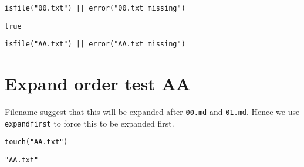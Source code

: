 \begin{lstlisting}[]
isfile("00.txt") || error("00.txt missing")
\end{lstlisting}


\begin{lstlisting}[]
true
\end{lstlisting}




\begin{lstlisting}[]
isfile("AA.txt") || error("AA.txt missing")
\end{lstlisting}



\chapter{Expand order test AA}



\label{7343046884903966924}{}


Filename suggest that this will be expanded after \texttt{00.md} and \texttt{01.md}. Hence we use \texttt{expandfirst} to force this to be expanded first.




\begin{lstlisting}[]
touch("AA.txt")
\end{lstlisting}


\begin{lstlisting}[]
"AA.txt"
\end{lstlisting}




